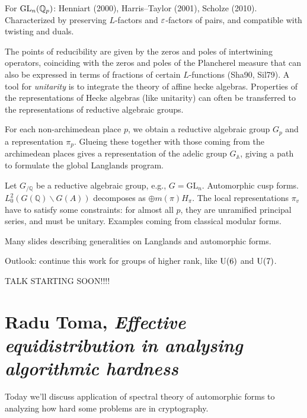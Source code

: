 \documentclass[reqno]{amsart} 
\numberwithin{theorem}{section}
\numberwithin{equation}{section}
\begin{document}
For $\operatorname{GL}_n(\mathbb{Q}_p)$: Henniart (2000), Harris--Taylor (2001), Scholze (2010).  Characterized by preserving $L$-factors and $\varepsilon$-factors of pairs, and compatible with twisting and duals.

The points of reducibility are given by the zeros and poles of intertwining operators, coinciding with the zeros and poles of the Plancherel measure that can also be expressed in terms of fractions of certain $L$-functions (Sha90, Sil79).  A tool for \emph{unitarity} is to integrate the theory of affine hecke algebras.  Properties of the representations of Hecke algebras (like unitarity) can often be transferred to the representations of reductive algebraic groups.

For each non-archimedean place $p$, we obtain a reductive algebraic group $G_p$ and a representation $\pi_p$.  Glueing these together with those coming from the archimedean places gives a representation of the adelic group $G_{\mathbb{A}}$, giving a path to formulate the global Langlands program.

Let $G_{/\mathbb{Q}}$ be a reductive algebraic group, e.g., $G = \mathrm{GL}_n$.  Automorphic cusp forms.  $L_0^2(G(\mathbb{Q}) \backslash G(A))$ decomposes as $\oplus m(\pi) H_\pi$.  The local representations $\pi_v$ have to satisfy some constraints: for almost all $p$, they are unramified principal series, and must be unitary.  Examples coming from classical modular forms.

Many slides describing generalities on Langlands and automorphic forms.

Outlook: continue this work for groups of higher rank, like $\operatorname{U}(6)$ and $\operatorname{U}(7)$.


TALK STARTING SOON!!!!

\section{Radu Toma, \emph{Effective equidistribution in analysing algorithmic hardness}}

Today we'll discuss application of spectral theory of automorphic forms to analyzing how hard some problems are in cryptography.
\end{document}
